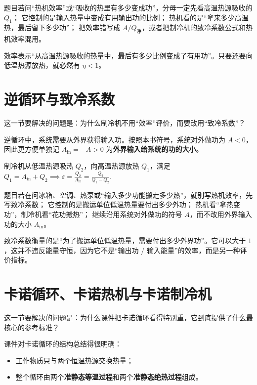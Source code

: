 \documentclass[lang=cn,11pt]{elegantbook}
\begin{document}
\begin{note}
 题目若问“热机效率”或“吸收的热里有多少变成功”，分母一定先看高温热源吸收的 \(Q_1\)； 它控制的是输入热量中变成有用输出功的比例； 热机看的是“拿来多少高温热，最后留下多少功”； 把效率错写成 \(A/Q_{\text{净}}\)，或者把制冷机的致冷系数公式和热机效率混用。
\end{note}

效率表示“从高温热源吸收的热量中，最后有多少比例变成了有用功”。只要还要向低温热源放热，就必然有 \(\eta<1\)。

\section{逆循环与致冷系数}

这一节要解决的问题是：为什么制冷机不用“效率”评价，而要改用“致冷系数”？

逆循环中，系统需要从外界获得输入功。按照本书符号，系统对外做功为 \(A<0\)，因此更方便单独记 \(A_{\text{in}}=-A>0\) 为\textbf{外界输入给系统的功的大小}。

制冷机从低温热源吸热 \(Q_2\)，向高温热源放热 \(Q_1\)，满足
 \(Q_1=A_{\text{in}}+Q_2 \implies \varepsilon=\frac{Q_2}{A_{\text{in}}}=\frac{Q_2}{Q_1-Q_2}.\) 

\begin{note}
 题目若在问冰箱、空调、热泵或“输入多少功能搬走多少热”，就别写热机效率，先写致冷系数； 它控制的是搬运单位低温热量要付出多少外功； 热机看“拿热变功”，制冷机看“花功搬热”； 继续沿用系统对外做功的符号 \(A\)，而不改用外界输入功的大小 \(A_{\text{in}}\)。
\end{note}

\begin{remark}
致冷系数衡量的是“为了搬运单位低温热量，需要付出多少外界功”。它可以大于 \(1\)，这并不违反能量守恒，因为它不是“输出功 / 输入能量”的效率，而是另一种评价指标。
\end{remark}

\section{卡诺循环、卡诺热机与卡诺制冷机}

这一节要解决的问题是：为什么课件把卡诺循环看得特别重，它到底提供了什么最核心的参考标准？

课件对卡诺循环的结构总结得很明确：
\begin{itemize}
 \item 工作物质只与两个恒温热源交换热量；
 \item 整个循环由两个\textbf{准静态等温过程}和两个\textbf{准静态绝热过程}组成。
\end{itemize}
\end{document}
